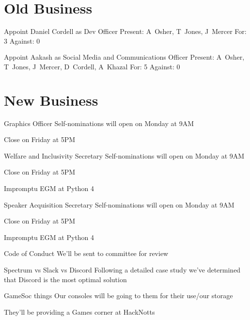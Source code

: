 \documentclass[11pt,hacksoc]{meetingmins}
\begin{document}
\section{Old Business}
\begin{items}
	\item
	Appoint Daniel Cordell as Dev Officer
		\subitem
		Present: A~Osher, T~Jones, J~Mercer
		\subitem
		For: 3
		\subitem
		Against: 0
		
	\item
	Appoint Aakash as Social Media and Communications Officer
		\subitem
		Present: A~Osher, T~Jones, J~Mercer, D~Cordell, A~Khazal
		\subitem
		For: 5
		\subitem
		Against: 0
			
	
\end{items}

\section{New Business}
\begin{items}
	\item
	Graphics Officer
		\subitem
		Self-nominations will open on Monday at 9AM
		
		\subitem
		Close on Friday at 5PM
	
	\item
	Welfare and Inclusivity Secretary
		\subitem
		Self-nominations will open on Monday at 9AM
		
		\subitem
		Close on Friday at 5PM
		
		\subitem
		Impromptu EGM at Python 4	
	
	\item
	Speaker Acquisition Secretary
		\subitem
		Self-nominations will open on Monday at 9AM
		
		\subitem
		Close on Friday at 5PM
		
		\subitem
		Impromptu EGM at Python 4
		
	\item
	Code of Conduct
		\subitem
		We'll be sent to committee for review
		
	\item
	Spectrum vs Slack vs Discord
		\subitem
		Following a detailed case study we've determined that Discord is the most optimal solution
	
	\item
	GameSoc things
		\subitem
		Our consoles will be going to them for their use/our storage
		
		\subitem
		They'll be providing a Games corner at HackNotts
\end{items}

\vspace{1em}
\nextmeeting{}
\end{document}
